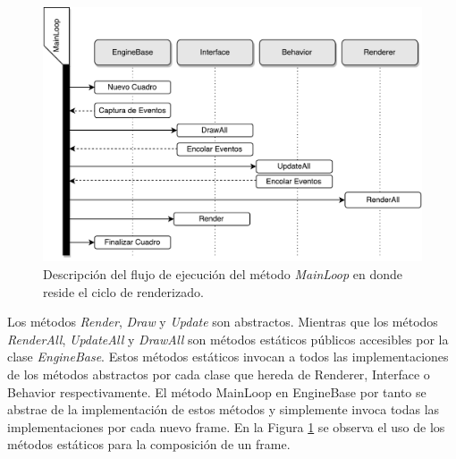 \begin{figure}[H]
	\centering
	\captionsetup{justification=centering}
	\includegraphics[width=\linewidth]{media/mainloopflow.pdf}
	\caption{Descripción del flujo de ejecución del método \emph{MainLoop} en donde reside el ciclo de renderizado.}
	\label{fig:main_loop}
\end{figure}

Los métodos \emph{Render}, \emph{Draw} y \emph{Update} son abstractos. Mientras que los métodos \emph{RenderAll}, \emph{UpdateAll} y \emph{DrawAll} son métodos estáticos públicos accesibles por la clase \emph{EngineBase}. Estos métodos estáticos invocan a todos las implementaciones de los métodos abstractos por cada clase que hereda de Renderer, Interface o Behavior respectivamente. El método MainLoop en EngineBase por tanto se abstrae de la implementación de estos métodos y simplemente invoca todas las implementaciones por cada nuevo frame. En la Figura \ref{fig:main_loop} se observa el uso de los métodos estáticos para la composición de un frame.
